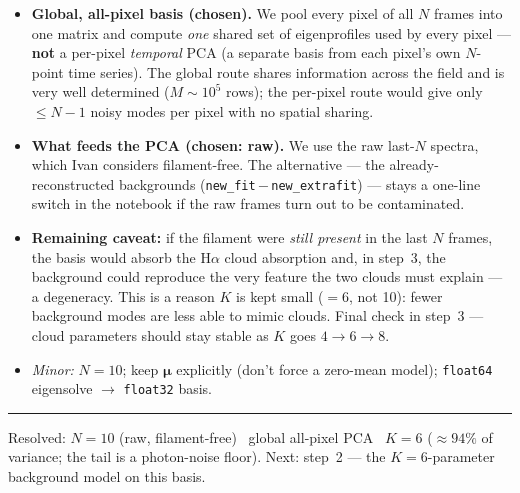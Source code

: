 \documentclass[10pt,a4paper]{article}
\newcommand{\co}[1]{{\small\texttt{#1}}}
\begin{document}
\begin{itemize}
\item[\textbf{a}] \textbf{Global, all-pixel basis (chosen).} We pool every pixel of all $N$ frames into one matrix and compute \emph{one} shared set of eigenprofiles used by every pixel --- \textbf{not} a per-pixel \emph{temporal} PCA (a separate basis from each pixel's own $N$-point time series). The global route shares information across the field and is very well determined ($M\!\sim\!10^5$ rows); the per-pixel route would give only $\le N{-}1$ noisy modes per pixel with no spatial sharing.
\item[\textbf{b}] \textbf{What feeds the PCA (chosen: raw).} We use the raw last-$N$ spectra, which Ivan considers filament-free. The alternative --- the already-reconstructed backgrounds (\co{new\_fit}\,$-$\,\co{new\_extrafit}) --- stays a one-line switch in the notebook if the raw frames turn out to be contaminated.
\item[\textbf{c}] \textbf{Remaining caveat:} if the filament were \emph{still present} in the last $N$ frames, the basis would absorb the H$\alpha$ cloud absorption and, in step~3, the background could reproduce the very feature the two clouds must explain --- a degeneracy. This is a reason $K$ is kept small ($=6$, not 10): fewer background modes are less able to mimic clouds. Final check in step~3 --- cloud parameters should stay stable as $K$ goes $4\to6\to8$.
\item[] \emph{Minor:} $N=10$; keep $\boldsymbol\mu$ explicitly (don't force a zero-mean model); \co{float64} eigensolve $\rightarrow$ \co{float32} basis.
\end{itemize}

\vspace{1pt}
{\footnotesize\color{gry}\rule{\textwidth}{0.4pt}}
{\sffamily\color{gry}\footnotesize Resolved: $N=10$ (raw, filament-free) \textbullet\ global all-pixel PCA \textbullet\ $K=6$ ($\approx94\%$ of variance; the tail is a photon-noise floor). Next: step~2 --- the $K{=}6$-parameter background model on this basis.}
\end{document}
